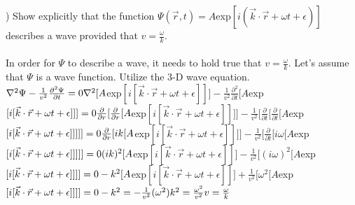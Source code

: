\documentclass[12pt]{article}
\begin{document}
) Show explicitly that the function 
$\Psi(\vec{r}, t) = A$exp$[i(\vec{k}\cdot\vec{r} + \omega t + \epsilon)]$
describes a wave provided that $v = \frac{\omega}{k}$.\\\\

\noindent In order for $\Psi$ to describe a wave, it needs to 
hold true that $v = \frac{\omega}{k}$. Let's assume that $\Psi$ 
is a wave function. Utilize the 3-D wave equation. \\
\noindent $\nabla^{2}\Psi-\frac{1}{v^{2}}\frac{\partial^{2}\Psi}{\partial t} = 0
\\\\\nabla^{2}[A$exp$[i[\vec{k}\cdot\vec{r}+\omega t + \epsilon]]]
-\frac{1}{v^{2}}\frac{\partial^{2}}{\partial t}[A$exp$[i[\vec{k}\cdot\vec{r}+\omega t + \epsilon]]] = 0
\\\\\frac{\partial}{\partial r}[\frac{\partial}{\partial r}[A$exp$[i[\vec{k}\cdot\vec{r}+\omega t + \epsilon]]]]
-\frac{1}{v^{2}}[\frac{\partial}{\partial t}[\frac{\partial}{\partial t}[A$exp$[i[\vec{k}\cdot\vec{r}+\omega t + \epsilon]]]]] = 0
\\\\\frac{\partial}{\partial r}[ik[A$exp$[i[\vec{k}\cdot\vec{r} + \omega t + \epsilon]]]]
- \frac{1}{v^{2}}[\frac{\partial}{\partial t}[i\omega[A$exp$[i[\vec{k}\cdot\vec{r} + \omega t + \epsilon]]]]] = 0
\\\\(ik)^{2}[A$exp$[i[\vec{k}\cdot\vec{r}+\omega t + \epsilon]]]
- \frac{1}{v^{2}}[(i\omega)^{2}[A$exp$[i[\vec{k}\cdot\vec{r} + \omega t + \epsilon]]]] = 0
\\\\-k^{2}[A$exp$[i[\vec{k}\cdot\vec{r} + \omega t + \epsilon]]]
+ \frac{1}{v^{2}}[\omega^{2}[A$exp$[i[\vec{k}\cdot\vec{r}+\omega t + \epsilon]]]] = 0
\\\\-k^{2} = -\frac{1}{v^{2}}(\omega^{2})
\\\\k^{2} = \frac{\omega^{2}}{v^{2}}
\\\\v = \frac{\omega}{k}$
\end{document}
